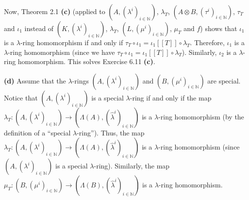 \documentclass[numbers=enddot,12pt,final,onecolumn,notitlepage]{scrartcl}%
\begin{document}
Now, Theorem 2.1 \textbf{(c)} (applied to $\left(  A,\left(  \lambda
^{i}\right)  _{i\in\mathbb{N}}\right)  $, $\lambda_{T}$, $\left(  A\otimes
B,\left(  \tau^{i}\right)  _{i\in\mathbb{N}}\right)  $, $\tau_{T}$ and
$\iota_{1}$ instead of $\left(  K,\left(  \lambda^{i}\right)  _{i\in
\mathbb{N}}\right)  $, $\lambda_{T}$, $\left(  L,\left(  \mu^{i}\right)
_{i\in\mathbb{N}}\right)  $, $\mu_{T}$ and $f$) shows that $\iota_{1}$ is a
$\lambda$-ring homomorphism if and only if $\tau_{T}\circ\iota_{1}=\iota
_{1}\left[  \left[  T\right]  \right]  \circ\lambda_{T}$. Therefore,
$\iota_{1}$ is a $\lambda$-ring homomorphism (since we have $\tau_{T}%
\circ\iota_{1}=\iota_{1}\left[  \left[  T\right]  \right]  \circ\lambda_{T}$).
Similarly, $\iota_{2}$ is a $\lambda$-ring homomorphism. This solves Exercise
6.11 \textbf{(c)}.

\textbf{(d)} Assume that the $\lambda$-rings $\left(  A,\left(  \lambda
^{i}\right)  _{i\in\mathbb{N}}\right)  $ and $\left(  B,\left(  \mu
^{i}\right)  _{i\in\mathbb{N}}\right)  $ are special. Notice that $\left(
A,\left(  \lambda^{i}\right)  _{i\in\mathbb{N}}\right)  $ is a special
$\lambda$-ring if and only if the map $\lambda_{T}:\left(  A,\left(
\lambda^{i}\right)  _{i\in\mathbb{N}}\right)  \rightarrow\left(
\Lambda\left(  A\right)  ,\left(  \widehat{\lambda}^{i}\right)  _{i\in
\mathbb{N}}\right)  $ is a $\lambda$-ring homomorphism (by the definition of a
\textquotedblleft special $\lambda$-ring\textquotedblright). Thus, the map
$\lambda_{T}:\left(  A,\left(  \lambda^{i}\right)  _{i\in\mathbb{N}}\right)
\rightarrow\left(  \Lambda\left(  A\right)  ,\left(  \widehat{\lambda}%
^{i}\right)  _{i\in\mathbb{N}}\right)  $ is a $\lambda$-ring homomorphism
(since $\left(  A,\left(  \lambda^{i}\right)  _{i\in\mathbb{N}}\right)  $ is a
special $\lambda$-ring). Similarly, the map $\mu_{T}:\left(  B,\left(  \mu
^{i}\right)  _{i\in\mathbb{N}}\right)  \rightarrow\left(  \Lambda\left(
B\right)  ,\left(  \widehat{\lambda}^{i}\right)  _{i\in\mathbb{N}}\right)  $
is a $\lambda$-ring homomorphism.
\end{document}
